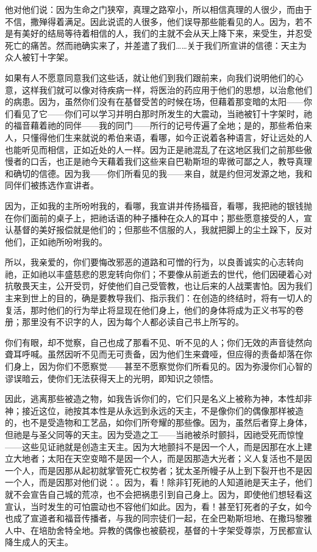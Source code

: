 他对他们说：因为生命之门狭窄，真理之路窄小，所以相信真理的人很少，而由于不信，撒殚得着满足。因此说谎的人很多，他们误导那些能看见的人。因为，若不是有美好的结局等待着相信的人，我们的主就不会从天上降下来，来受生，并忍受死亡的痛苦。然而祂确实来了，并差遣了我们……关于我们所宣讲的信德：天主为众人被钉十字架。\par

如果有人不愿意同意我们这些话，就让他们到我们跟前来，向我们说明他们的心意，这样我们就可以像对待疾病一样，将医治的药应用于他们的思想，以治愈他们的病患。因为，虽然你们没有在基督受苦的时候在场，但藉着那变暗的太阳——你们看见了它——你们可以学习并明白那时所发生的大震动，当祂被钉十字架时，祂的福音藉着祂的同伴——我的同门——所行的记号传遍了全地；是的，那些希伯来人，只懂得他们生来就说的希伯来语，看哪，如今正说着各种语言，好让远处的人也能听见而相信，正如近处的人一样。因为正是祂混乱了在这地区我们之前那些傲慢者的口舌，也正是祂今天藉着我们这些来自巴勒斯坦的卑微可鄙之人，教导真理和确切的信德。因为我——你们所看见的我——来自，就是约但河发源之地，我和同伴们被拣选作宣讲者。\par

因为，正如我的主所吩咐我的，看哪，我宣讲并传扬福音，看哪，我把祂的银钱抛在你们面前的桌子上，把祂话语的种子播种在众人的耳中；那些愿意接受的人，宣认基督的美好报偿就是他们的；但那些不信服的人，我就把脚上的尘土跺下，反对他们，正如祂所吩咐我的。\par

所以，我亲爱的，你们要悔改邪恶的道路和可憎的行为，以良善诚实的心志转向祂，正如祂以丰盛慈悲的恩宠转向你们；不要像从前逝去的世代，他们因硬着心对抗敬畏天主，公开受罚，好使他们自己受管教，也让后来的人战栗害怕。因为我们主来到世上的目的，确是要教导我们、指示我们：在创造的终结时，将有一切人的复活，那时他们的行为举止将显现在他们身上，他们的身体将成为正义书写的卷册；那里没有不识字的人，因为每个人都必读自己书上所写的。\par

你们有眼，却不觉察，自己也成了那看不见、听不见的人；你们无效的声音徒然向聋耳呼喊。虽然因听不见而无可责备，因为他们生来聋哑，但应得的责备却落在你们身上，因为你们不愿察觉——甚至不愿察觉你们所看见的。因为弥漫你们心智的谬误暗云，使你们无法获得天上的光明，即知识之领悟。\par

因此，逃离那些被造之物，如我告诉你们的，它们只是名义上被称为神，本性却非神；接近这位，祂按其本性是从永远到永远的天主，不是像你们的偶像那样被造的，也不是受造物和工艺品，如你们所夸耀的那些像。因为，虽然后者穿上身体，但祂是与圣父同等的天主。因为受造之工——当祂被杀时颤抖，因祂受死而惊惶——这些见证祂就是创造主天主。因为大地颤抖不是因一个人，而是因那在水上建立大地者；太阳在天空变暗不是因一个人，而是因那造大光者；义人复活也不是因一个人，而是因那从起初就掌管死亡权势者；犹太圣所幔子从上到下裂开也不是因一个人，而是因那对他们说：。因为，看！除非钉死祂的人知道祂是天主子，他们就不会宣告自己城的荒凉，也不会把祸患引到自己身上。因为，即使他们想轻看这宣认，当时发生的可怕震动也不容他们如此。因为，看！甚至钉死者的子女，如今也成了宣道者和福音传播者，与我的同宗徒们一起，在全巴勒斯坦地、在撒玛黎雅人中、在培肋舍特全地。异教的偶像也被藐视，基督的十字架受尊崇，万民都宣认降生成人的天主。\par

